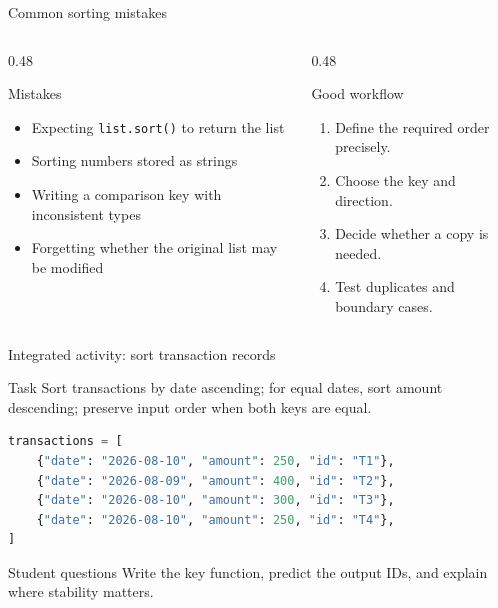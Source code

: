 \documentclass[aspectratio=169]{beamer}
\begin{document}
\begin{frame}{Common sorting mistakes}
  \begin{columns}[T]
    \begin{column}{0.48\textwidth}
      \begin{alertblock}{Mistakes}
        \begin{itemize}
          \item Expecting \texttt{list.sort()} to return the list
          \item Sorting numbers stored as strings
          \item Writing a comparison key with inconsistent types
          \item Forgetting whether the original list may be modified
        \end{itemize}
      \end{alertblock}
    \end{column}
    \begin{column}{0.48\textwidth}
      \begin{exampleblock}{Good workflow}
        \begin{enumerate}
          \item Define the required order precisely.
          \item Choose the key and direction.
          \item Decide whether a copy is needed.
          \item Test duplicates and boundary cases.
        \end{enumerate}
      \end{exampleblock}
    \end{column}
  \end{columns}
\end{frame}

\begin{frame}[fragile]{Integrated activity: sort transaction records}
  \begin{block}{Task}
    Sort transactions by date ascending; for equal dates, sort amount
    descending; preserve input order when both keys are equal.
  \end{block}
\begin{lstlisting}[language=Python,basicstyle=\ttfamily\scriptsize]
transactions = [
    {"date": "2026-08-10", "amount": 250, "id": "T1"},
    {"date": "2026-08-09", "amount": 400, "id": "T2"},
    {"date": "2026-08-10", "amount": 300, "id": "T3"},
    {"date": "2026-08-10", "amount": 250, "id": "T4"},
]
\end{lstlisting}
  \begin{alertblock}{Student questions}
    Write the key function, predict the output IDs, and explain where stability
    matters.
  \end{alertblock}
\end{frame}
\end{document}
